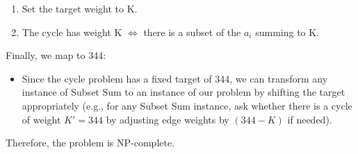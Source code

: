 \begin{enumerate} \item Set the target weight to K. \item The cycle has weight K $\iff$ there is a subset of the $a_i$ summing to K. \end{enumerate}
Finally, we map to 344:
\begin{itemize} \item Since the cycle problem has a fixed target of 344, we can transform any instance of Subset Sum to an instance of our problem by shifting the target appropriately (e.g., for any Subset Sum instance, ask whether there is a cycle of weight $K' = 344$ by adjusting edge weights by $(344 - K)$ if needed). \end{itemize}
Therefore, the problem is NP-complete.